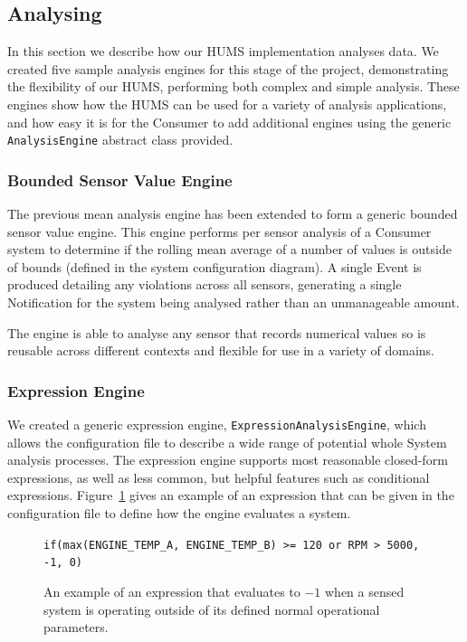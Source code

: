 \documentclass[10pt,a4paper]{article}
\begin{document}
\subsection{Analysing}
\label{sec:analysis}
In this section we describe how our HUMS implementation analyses data. We created five sample analysis engines for this stage of the project, demonstrating the flexibility of our HUMS, performing both complex and simple analysis. These engines show how the HUMS can be used for a variety of analysis applications, and how easy it is for the Consumer to add additional engines using the generic \texttt{AnalysisEngine} abstract class provided.

\subsubsection{Bounded Sensor Value Engine}
The previous mean analysis engine has been extended to form a generic bounded sensor value engine. This engine performs per sensor analysis of a Consumer system to determine if the rolling mean average of a number of values is outside of bounds (defined in the system configuration diagram). A single Event is produced detailing any violations across all sensors, generating a single Notification for the system being analysed rather than an unmanageable amount.

The engine is able to analyse any sensor that records numerical values so is reusable across different contexts and flexible for use in a variety of domains.

\subsubsection{Expression Engine}
We created a generic expression engine, \texttt{ExpressionAnalysisEngine}, which allows the configuration file to describe a wide range of potential whole System analysis processes. The expression engine supports most reasonable closed-form expressions, as well as less common, but helpful features such as conditional expressions. Figure~\ref{fig:exprExample} gives an example of an expression that can be given in the configuration file to define how the engine evaluates a system.
\begin{figure}[ht]
\centering
\verb+if(max(ENGINE_TEMP_A, ENGINE_TEMP_B) >= 120 or RPM > 5000, -1, 0)+
\caption{An example of an expression that evaluates to $-1$ when a sensed system is operating outside of its defined normal operational parameters.}
\label{fig:exprExample}
\end{figure}
\end{document}
